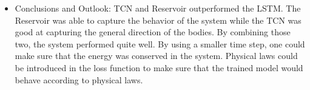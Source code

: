 \documentclass[%
 reprint,
 amsmath,amssymb,
 aps,
]{revtex4-2}
\begin{document}
\begin{itemize}
    \item Conclusions and Outlook: TCN and Reservoir outperformed the LSTM. The Reservoir was able to capture the behavior of the system while the TCN was good at capturing the general direction of the bodies. By combining those two, the system performed quite well.
    By using a smaller time step, one could make sure that the energy was conserved in the system. Physical laws could be introduced in the loss function to make sure that the trained model would behave according to physical laws. 
\end{itemize}

\end{document}
